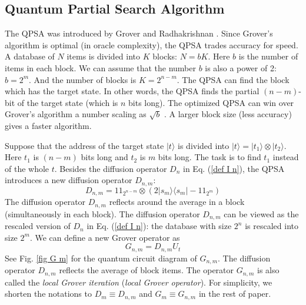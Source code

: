 \documentclass[%
 twocolumn,
 10pt,
 superscriptaddress,
 longbibliography,
 amsmath,amssymb,
 aps,
 pra,
floatfix,
]{revtex4-1}
\begin{document}
\subsection{\label{subsec:QPSA}Quantum Partial Search Algorithm} 

The QPSA was introduced by Grover and Radhakrishnan \cite{GR05}. Since Grover's algorithm is optimal (in oracle complexity), the QPSA trades accuracy for speed. A database of $N$ items is divided into $K$ blocks: $N=bK$. Here $b$ is the number of items in each block. We can assume that the number $b$ is also a power of 2: $b=2^m$. And the number of blocks is $K=2^{n-m}$. The QPSA can find the block which has the target state. In other words, the QPSA finds the partial $(n-m)$-bit of the target state (which is $n$ bits long). The optimized QPSA can win over Grover's algorithm a number scaling as $\sqrt b$ \cite{GR05,Korepin05,KG06}. A larger block size (less accuracy) gives a faster algorithm. 

Suppose that the address of the target state $|t\rangle$ is divided into $|t\rangle=|t_1\rangle\otimes|t_2\rangle$. Here $t_1$ is $(n-m)$ bits long and $t_2$ is $m$ bits long. The task is to find $t_1$ instead of the whole $t$. Besides the diffusion operator $D_n$ in Eq. (\ref{def I n}), the QPSA introduces a new diffusion operator $D_{n,m}$:
\begin{equation}
    \label{def I n m}
    D_{n,m} = 1\!\!1_{2^{n-m}}\otimes (2|s_m\rangle\langle s_m|-1\!\!1_{2^m})
\end{equation}
The diffusion operator $D_{n,m}$ reflects around the average in a block (simultaneously in each block). The diffusion operator $D_{n,m}$ can be viewed as the rescaled version of $D_n$ in Eq. (\ref{def I n}): the database with size $2^n$ is rescaled into size $2^{m}$. We can define a new Grover operator as
\begin{equation}
    \label{def G m}
    G_{n,m}=D_{n,m}U_t
\end{equation}
See Fig. \ref{fig G m} for the quantum circuit diagram of $G_{n,m}$. The diffusion operator $D_{n,m}$ reflects the average of block items. The operator $G_{n,m}$ is also called the {\it local Grover iteration} ({\it local Grover operator}). For simplicity, we shorten the notations to $D_{m}\equiv D_{n,m}$ and $G_{m}\equiv G_{n,m}$ in the rest of paper. 
\end{document}
